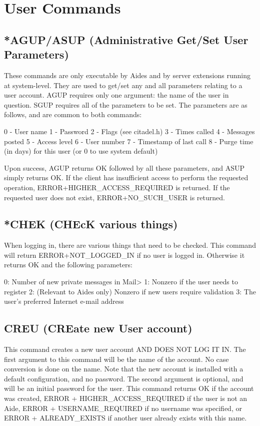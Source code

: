 \section{User Commands}



\subsection{*AGUP/ASUP (Administrative Get/Set User Parameters)}

 These commands are only executable by Aides and by server extensions running
at system-level.  They are used to get/set any and all parameters relating to
a user account.  AGUP requires only one argument: the name of the user in
question.  SGUP requires all of the parameters to be set.  The parameters are
as follows, and are common to both commands:

 0 - User name
 1 - Password
 2 - Flags (see citadel.h)
 3 - Times called
 4 - Messages posted
 5 - Access level
 6 - User number
 7 - Timestamp of last call
 8 - Purge time (in days) for this user (or 0 to use system default)

 Upon success, AGUP returns OK followed by all these parameters, and ASUP
simply returns OK.  If the client has insufficient access to perform the
requested operation, ERROR+HIGHER_ACCESS_REQUIRED is returned.  If the
requested user does not exist, ERROR+NO_SUCH_USER is returned.



\subsection{*CHEK (CHEcK various things)}

 When logging in, there are various things that need to be checked.   This
command will return ERROR+NOT_LOGGED_IN if no user is logged in.  Otherwise
it returns OK and the following parameters:

 0: Number of new private messages in Mail>
 1: Nonzero if the user needs to register
 2: (Relevant to Aides only) Nonzero if new users require validation
 3: The user's preferred Internet e-mail address



\subsection{CREU (CREate new User account)}

 This command creates a new user account AND DOES NOT LOG IT IN.  The first
argument to this command will be the name of the account.  No case conversion
is done on the name.  Note that the new account is installed with a default
configuration, and no password.  The second argument is optional, and will be
an initial password for the user.  This command returns OK if the account was
created, ERROR + HIGHER_ACCESS_REQUIRED if the user is not an Aide, ERROR +
USERNAME_REQUIRED if no username was specified, or ERROR + ALREADY_EXISTS if
another user already exists with this name.

